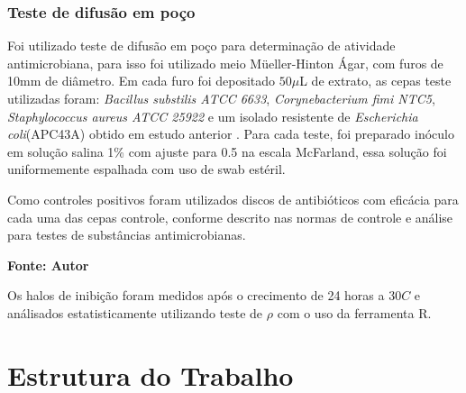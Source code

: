 \subsubsection{Teste de difusão em poço}
Foi utilizado teste de difusão em poço para determinação de atividade antimicrobiana,
para isso foi utilizado meio Müeller-Hinton Ágar, com furos de 10mm de diâmetro.
Em cada furo foi depositado $50\mu$L de extrato, as cepas teste utilizadas foram:
\textit{Bacillus substilis ATCC 6633}, \textit{Corynebacterium fimi NTC5}, \textit{Staphylococcus aureus ATCC 25922}
e um isolado resistente de \textit{Escherichia coli}(APC43A) obtido em estudo anterior \cite{dhara2019}.
Para cada teste, foi preparado inóculo em solução salina 1\% com ajuste para 0.5
na escala McFarland, essa solução foi uniformemente espalhada com uso de swab estéril.

Como controles positivos foram utilizados discos de antibióticos com
eficácia para cada uma das cepas controle, conforme descrito nas normas de controle e
análise para testes de substâncias antimicrobianas\cite{clsi2020}.

\begin{table}[!htb]
    \caption{Antibióticos utilizados como controle}
    \label{tab:lista_antibioticos}
    \centering
    \begin{small}\textbf{Fonte: Autor}\end{small}
\end{table}


Os halos de inibição foram medidos após o crecimento de 24 horas a $30$\textdegree$C$
e análisados estatisticamente utilizando teste de $\rho$ com
o uso da ferramenta R.

\section{Estrutura do Trabalho}



